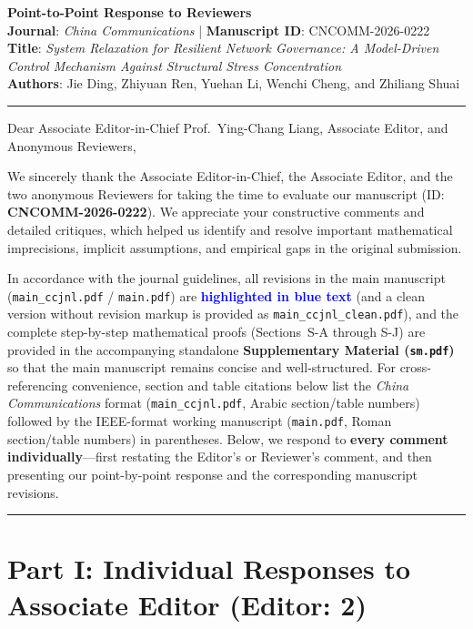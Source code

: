 \documentclass[11pt,a4paper]{article}
\begin{document}
\begin{center}
    {\LARGE \textbf{Point-to-Point Response to Reviewers}}\\[0.8em]
    {\large \textbf{Journal}: \textit{China Communications} \quad | \quad \textbf{Manuscript ID}: CNCOMM-2026-0222}\\[0.4em]
    {\large \textbf{Title}: \textit{System Relaxation for Resilient Network Governance: A Model-Driven Control Mechanism Against Structural Stress Concentration}}\\[0.4em]
    {\normalsize \textbf{Authors}: Jie Ding, Zhiyuan Ren, Yuehan Li, Wenchi Cheng, and Zhiliang Shuai}
\end{center}

\hrule
\vspace{1em}

Dear Associate Editor-in-Chief Prof.\ Ying-Chang Liang, Associate Editor, and Anonymous Reviewers,

We sincerely thank the Associate Editor-in-Chief, the Associate Editor, and the two anonymous Reviewers for taking the time to evaluate our manuscript (ID: \textbf{CNCOMM-2026-0222}). We appreciate your constructive comments and detailed critiques, which helped us identify and resolve important mathematical imprecisions, implicit assumptions, and empirical gaps in the original submission.

In accordance with the journal guidelines, all revisions in the main manuscript (\texttt{main\_ccjnl.pdf} / \texttt{main.pdf}) are \textbf{\textcolor{blue}{highlighted in blue text}} (and a clean version without revision markup is provided as \texttt{main\_ccjnl\_clean.pdf}), and the complete step-by-step mathematical proofs (Sections~S-A through S-J) are provided in the accompanying standalone \textbf{Supplementary Material (\texttt{sm.pdf})} so that the main manuscript remains concise and well-structured. For cross-referencing convenience, section and table citations below list the \textit{China Communications} format (\texttt{main\_ccjnl.pdf}, Arabic section/table numbers) followed by the IEEE-format working manuscript (\texttt{main.pdf}, Roman section/table numbers) in parentheses. Below, we respond to \textbf{every comment individually}---first restating the Editor's or Reviewer's comment, and then presenting our point-by-point response and the corresponding manuscript revisions.

\vspace{0.5em}
\hrule
\section*{Part I: Individual Responses to Associate Editor (Editor: 2)}
\end{document}
